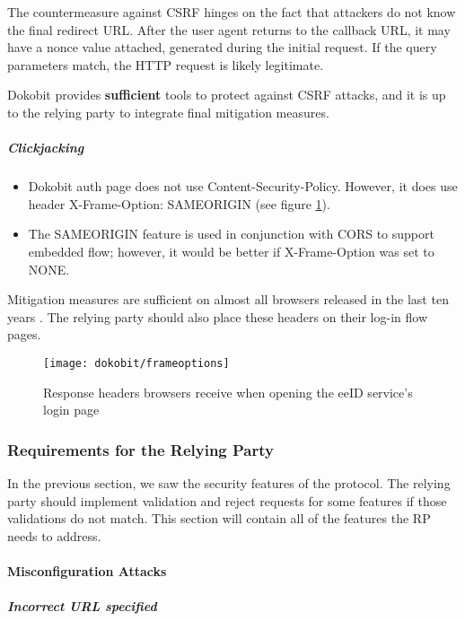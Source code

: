 The countermeasure against CSRF hinges on the fact that attackers do not know the final redirect URL. After the user agent returns to the callback URL, it may have a nonce value attached, generated during the initial request. If the query parameters match, the HTTP request is likely legitimate.

Dokobit provides \textbf{sufficient} tools to protect against CSRF attacks, and it is up to the relying party to integrate final mitigation measures.

\subparagraph{Clickjacking}

\begin{itemize}
  \item Dokobit auth page does not use Content-Security-Policy. However, it does use header X-Frame-Option: {SAMEORIGIN} (see figure \ref{fig:dokobit-responseheaders}).
  \item The {SAMEORIGIN} feature is used in conjunction with CORS to support embedded flow; however, it would be better if X-Frame-Option was set to {NONE}.
\end{itemize}

Mitigation measures are sufficient on almost all browsers released in the last ten years \cite{caniuse-xframeoptions}. The relying party should also place these headers on their log-in flow pages.

\begin{figure}
  \centering
  \texttt{[image: dokobit/frameoptions]}
  \caption{Response headers browsers receive when opening the eeID service's login page}
  \label{fig:dokobit-responseheaders}
\end{figure}

\subsubsection{Requirements for the Relying Party}

In the previous section, we saw the security features of the protocol. The relying party should implement validation and reject requests for some features if those validations do not match. This section will contain all of the features the RP needs to address.

\paragraph{Misconfiguration Attacks}

\subparagraph{Incorrect URL specified}

